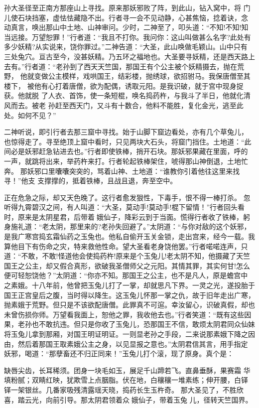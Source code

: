 孙大圣径至正南方那座山上寻找。原来那妖邪败了阵，到此山，钻入窝中，将
门儿使石块挡塞，虚怯怯藏隐不出。行者寻一会不见动静，心甚焦恼，捻着诀，念
动真言，唤出那山中土地、山神审问。少时，二神至了，叩头道：“不知!不知!知
当远接。万望恕罪！”行者道：“我且不打你。我问你：这山叫做甚么名字?此处有
多少妖精?从实说来，饶你罪过。”二神告道：“大圣，此山唤做毛颖山。山中只有
三处兔穴。亘古至今，没甚妖精。乃五环之福地也。大圣要寻妖精，还是西天路上
去有。”行者道：“老孙到了西天天竺国，那国王有个公主被个妖精摄去，抛在荒野，
他就变做公主模样，戏哄国王，结彩楼，抛绣球，欲招驸马。我保唐僧至其楼下，
被他有心打着唐僧，欲为配偶，诱取元阳。是我识破，就于宫中现身捉获。他就脱
了人衣、首饰，使一条短棍，唤名捣药杵，与我斗了半日，他就化清风而去。被老
孙赶至西天门，又斗有十数合，他料不能胜，复化金光，逃至此处。如何不见？”

二神听说，即引行者去那三窟中寻找。始于山脚下窟边看处，亦有几个草兔儿，
也惊得走了。寻至绝顶上窟中看时，只见两块大石头，将窟门挡住。土地道：“此
间必是妖邪赶急钻进去也。”行者即使铁棒，捎开石块。那妖邪果藏在里面，呼的
一声，就跳将出来，举药杵来打。行者轮起铁棒架住，唬得那山神倒退，土地忙奔。
那妖邪口里囔囔突突的，骂着山神、土地道：“谁教你引着他往这里来找寻！”他支
支撑撑的，抵着铁棒，且战且退，奔至空中。

正在危急之际，却又天色晚了。这行者愈发狠性，下毒手，恨不得一棒打杀。
忽听得九霄碧汉之间，有人叫道：“大圣，莫动手!莫动手!棍下留情！”行者回头看
时，原来是太阴星君，后带着娥仙子，降彩云到于当面。慌得行者收了铁棒，躬
身施礼道：“老太阴，那里来的?老孙失回避了。”太阴道：“与你对敌的这个妖邪，
是我广寒宫捣玄霜仙药之玉兔也。他私自偷开玉关金锁，走出宫来，经今一载。我
算他目下有伤命之灾，特来救他性命。望大圣看老身饶他罢。”行者喏喏连声，只
道：“不敢，不敢!怪道他会使捣药杵!原来是个玉兔儿!老太阴不知，他摄藏了天竺
国王之公主，却又假合真形，欲破我圣僧师父之元阳。其情其罪，其实何甘!怎么
便可轻恕饶他？”太阴道：“你亦不知。那国王之公主，也不是凡人，原是蟾宫中
之素娥。十八年前，他曾把玉兔儿打了一掌，却就思凡下界。一灵之光，遂投胎于
国王正宫皇后之腹，当时得以降生。这玉兔儿怀那一掌之仇，故于旧年走出广寒，
抛素娥于荒野。但只是不该欲配唐僧。此罪真不可逭。幸汝留心，识破真假，却也
未曾伤损你师。万望看我面上，恕他之罪，我收他去也。”行者笑道：“既有这些因
果，老孙也不敢抗违。但只是你收了玉兔儿，恐那国王不信，敢烦太阴君同众仙妹
将玉兔儿拿到那厢，对国王明证明证。一则显老孙之手段，二来说那素娥下降之因
由，然后着那国王取素娥公主之身，以见显报之意也。”太阴君信其言，用手指定
妖邪，喝道：“那孽畜还不归正同来！”玉兔儿打个滚，现了原身。真个是：

缺唇尖齿，长耳稀须。团身一块毛如玉，展足千山蹄若飞。直鼻垂酥，果赛霜
华填粉腻；双睛红映，犹欺雪上点胭脂。伏在地，白穰穰一堆素练；伸开腰，白铎
铎一架银丝。几番家吸残清露瑶天晓，捣药长生玉杵奇。
那大圣见了，不胜欣喜，踏云光，向前引导。那太阴君领着众娥仙子，带着玉兔
儿，径转天竺国界。

